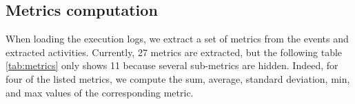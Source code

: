 \subsection{Metrics computation}

When loading the execution logs, we extract a set of metrics from the events and extracted activities. Currently, 27 metrics are extracted, but the following table \ref{tab:metrics} only shows 11 because several sub-metrics are hidden. Indeed, for four of the listed metrics, we compute the sum, average, standard deviation, min, and max values of the corresponding metric.



